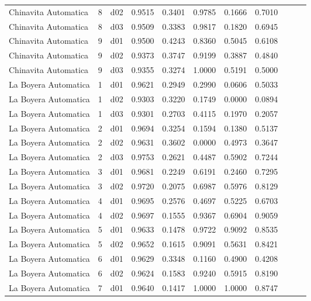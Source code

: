 \begin{landscape}
\begin{longtable}{p{5cm}rrrrrrrrrr}
 Chinavita Automatica  & 8 &     d02 &   0.9515 &  0.3401 &    0.9785 &   0.1666 &    0.7010 \\
 Chinavita Automatica  & 8 &     d03 &   0.9509 &  0.3383 &    0.9817 &   0.1820 &    0.6945 \\
 Chinavita Automatica  & 9 &     d01 &   0.9500 &  0.4243 &    0.8360 &   0.5045 &    0.6108 \\
 Chinavita Automatica  & 9 &     d02 &   0.9373 &  0.3747 &    0.9199 &   0.3887 &    0.4840 \\
 Chinavita Automatica  & 9 &     d03 &   0.9355 &  0.3274 &    1.0000 &   0.5191 &    0.5000 \\
 La Boyera Automatica  & 1 &     d01 &   0.9621 &  0.2949 &    0.2990 &   0.0606 &    0.5033 \\
 La Boyera Automatica  & 1 &     d02 &   0.9303 &  0.3220 &    0.1749 &   0.0000 &    0.0894 \\
 La Boyera Automatica  & 1 &     d03 &   0.9301 &  0.2703 &    0.4115 &   0.1970 &    0.2057 \\
 La Boyera Automatica  & 2 &     d01 &   0.9694 &  0.3254 &    0.1594 &   0.1380 &    0.5137 \\
 La Boyera Automatica  & 2 &     d02 &   0.9631 &  0.3602 &    0.0000 &   0.4973 &    0.3647 \\
 La Boyera Automatica  & 2 &     d03 &   0.9753 &  0.2621 &    0.4487 &   0.5902 &    0.7244 \\
 La Boyera Automatica  & 3 &     d01 &   0.9681 &  0.2249 &    0.6191 &   0.2460 &    0.7295 \\
 La Boyera Automatica  & 3 &     d02 &   0.9720 &  0.2075 &    0.6987 &   0.5976 &    0.8129 \\
 La Boyera Automatica  & 4 &     d01 &   0.9695 &  0.2576 &    0.4697 &   0.5225 &    0.6703 \\
 La Boyera Automatica  & 4 &     d02 &   0.9697 &  0.1555 &    0.9367 &   0.6904 &    0.9059 \\
 La Boyera Automatica  & 5 &     d01 &   0.9633 &  0.1478 &    0.9722 &   0.9092 &    0.8535 \\
 La Boyera Automatica  & 5 &     d02 &   0.9652 &  0.1615 &    0.9091 &   0.5631 &    0.8421 \\
 La Boyera Automatica  & 6 &     d01 &   0.9629 &  0.3348 &    0.1160 &   0.4900 &    0.4208 \\
 La Boyera Automatica  & 6 &     d02 &   0.9624 &  0.1583 &    0.9240 &   0.5915 &    0.8190 \\
 La Boyera Automatica  & 7 &     d01 &   0.9640 &  0.1417 &    1.0000 &   1.0000 &    0.8747 \\

\end{longtable}
\end{landscape}
